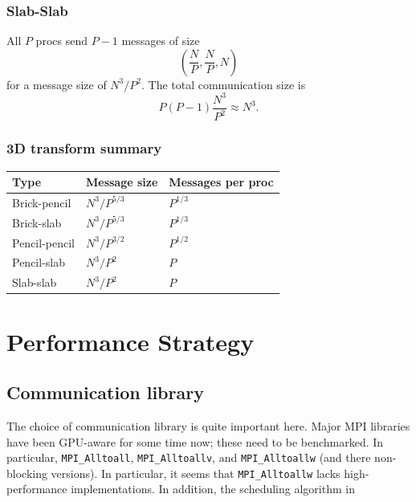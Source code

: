 \documentclass[12pt]{article}
\renewcommand{\(}{\left(}
\renewcommand{\)}{\right)}
\begin{document}
\subsubsection{Slab-Slab}
All $P$ procs send $P-1$ messages of size
\begin{dmath}
  \left(\frac{N}{P}, \frac{N}{P}, N \right)
\end{dmath}
for a message size of $N^3/P^2$. The total communication size is
\begin{dmath}
  P \(P-1\) \frac{N^3}{P^2} \approx N^3.
\end{dmath}

\subsubsection{3D transform summary}

\begin{centering}
  \begin{table}[htbp]
    \begin{tabular}{|l|l|l|}
      \hline
      Type          & Message size  & Messages per proc \\
      \hline
      Brick-pencil  & $N^3/P^{5/3}$ & $P^{1/3}$          \\
      Brick-slab    & $N^3/P^{5/3}$ & $P^{1/3}$          \\
      Pencil-pencil & $N^3/P^{3/2}$ & $P^{1/2}$        \\
      Pencil-slab   & $N^3/P^2$    & $P$               \\
      Slab-slab     & $N^3/P^2$    & $P$               \\
      \hline
    \end{tabular}
  \end{table}
\end{centering}

\section{Performance Strategy}

\subsection{Communication library}

The choice of communication library is quite important here.  Major
MPI libraries have been GPU-aware for some time now; these need to be
benchmarked.  In particular, \texttt{MPI_Alltoall},
\texttt{MPI_Alltoallv}, and \texttt{MPI_Alltoallw} (and there
non-blocking versions).  In particular, it seems that
\texttt{MPI_Alltoallw} lacks high-performance implementations.  In
addition, the scheduling algorithm
in~\cite{schreuder1980constructing}
\end{document}
